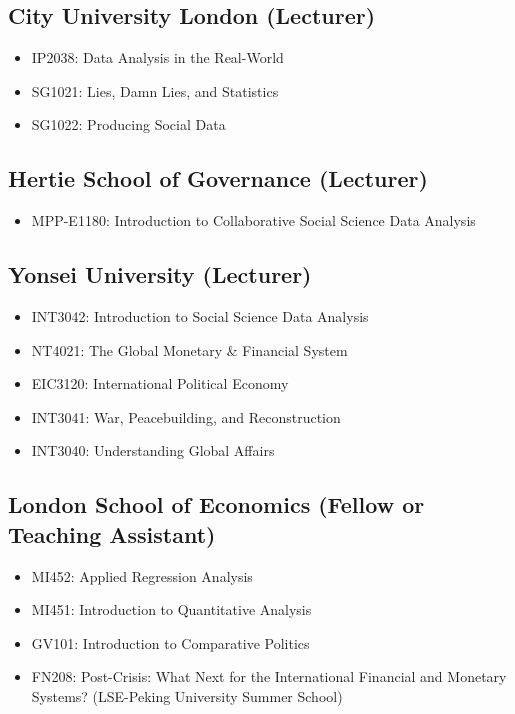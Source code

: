 \documentclass[a4paper]{article}
\begin{document}
\subsection*{City University London (Lecturer)}

\begin{itemize}
    \item IP2038: Data Analysis in the Real-World
    \item SG1021: Lies, Damn Lies, and Statistics
    \item SG1022: Producing Social Data
\end{itemize}

\subsection*{Hertie School of Governance (Lecturer)}

\begin{itemize}

    \item MPP-E1180: Introduction to Collaborative Social Science Data Analysis

\end{itemize}

\subsection*{Yonsei University (Lecturer)}

\begin{itemize}

    \item INT3042: Introduction to Social Science Data Analysis
    \item NT4021: The Global Monetary \& Financial System
    \item EIC3120: International Political Economy
    \item INT3041: War, Peacebuilding, and Reconstruction
    \item INT3040: Understanding Global Affairs

\end{itemize}

\subsection*{London School of Economics (Fellow or Teaching Assistant)}

\begin{itemize}
    \item MI452: Applied Regression Analysis
    \item MI451: Introduction to Quantitative Analysis
    \item GV101: Introduction to Comparative Politics
    \item FN208: Post-Crisis: What Next for the International Financial and Monetary Systems? (LSE-Peking University Summer School)
\end{itemize}
\end{document}
